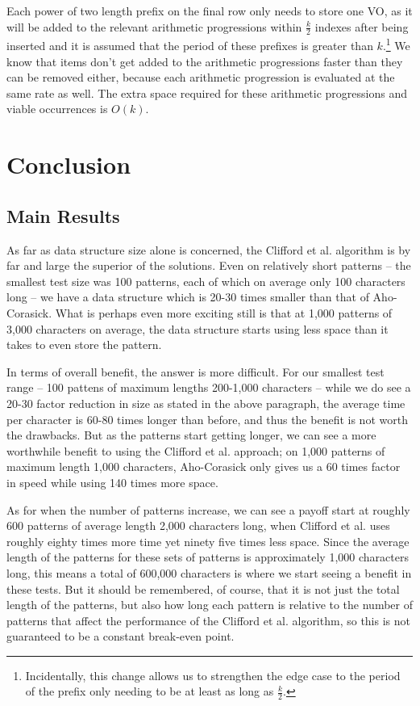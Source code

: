 \documentclass[ %
                    author={Dominic Joseph Moylett},
                    degree={MEng},
                     title={Dictionary Matching with Fingerprints},
                  subtitle={An Empirical Analysis},
                      type={research},
                      year={2015} ]{dissertation}
\begin{document}
Each power of two length prefix on the final row only needs to store one VO, as it will be added to the relevant arithmetic progressions within $\frac{k}{2}$ indexes after being inserted and it is assumed that the period of these prefixes is greater than $k$.\footnote{Incidentally, this change allows us to strengthen the edge case to the period of the prefix only needing to be at least as long as $\frac{k}{2}$.} We know that items don't get added to the arithmetic progressions faster than they can be removed either, because each arithmetic progression is evaluated at the same rate as well. The extra space required for these arithmetic progressions and viable occurrences is $O(k)$.


\chapter{Conclusion}
\label{chap:conclusion}

\section{Main Results}

As far as data structure size alone is concerned, the Clifford et al. algorithm is by far and large the superior of the solutions. Even on relatively short patterns -- the smallest test size was 100 patterns, each of which on average only 100 characters long -- we have a data structure which is 20-30 times smaller than that of Aho-Corasick. What is perhaps even more exciting still is that at 1,000 patterns of 3,000 characters on average, the data structure starts using less space than it takes to even store the pattern.

In terms of overall benefit, the answer is more difficult. For our smallest test range -- 100 pattens of maximum lengths 200-1,000 characters -- while we do see a 20-30 factor reduction in size as stated in the above paragraph, the average time per character is 60-80 times longer than before, and thus the benefit is not worth the drawbacks. But as the patterns start getting longer, we can see a more worthwhile benefit to using the Clifford et al. approach; on 1,000 patterns of maximum length 1,000 characters, Aho-Corasick only gives us a 60 times factor in speed while using 140 times more space.

As for when the number of patterns increase, we can see a payoff start at roughly 600 patterns of average length 2,000 characters long, when Clifford et al. uses roughly eighty times more time yet ninety five times less space. Since the average length of the patterns for these sets of patterns is approximately 1,000 characters long, this means a total of 600,000 characters is where we start seeing a benefit in these tests. But it should be remembered, of course, that it is not just the total length of the patterns, but also how long each pattern is relative to the number of patterns that affect the performance of the Clifford et al. algorithm, so this is not guaranteed to be a constant break-even point.
\end{document}
